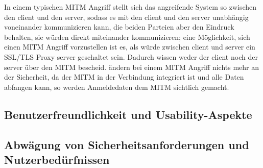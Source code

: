 In einem typischen \ac{MITM} Angriff stellt sich das angreifende System so zwischen den \gls{client} und den \gls{server}, sodass es mit den \gls{client} und den \gls{server} unabhängig voneinander kommunizieren kann, die beiden Parteien aber den Eindruck behalten, sie würden direkt miteinander kommunizieren; eine Möglichkeit, sich einen \ac{MITM} Angriff vorzustellen ist es, als würde zwischen \gls{client} und \gls{server} ein \ac{SSL}/\ac{TLS} Proxy \gls{server} geschaltet sein.\autocite[\vglf][]{greenwood2014smv} Dadurch wissen weder der \gls{client} noch der \gls{server} über den \ac{MITM} bescheid.
 ändern bei einem \ac{MITM} Angriff nichts mehr an der Sicherheit, da der \ac{MITM} in der Verbindung integriert ist und alle Daten abfangen kann, so werden \zb Anmeldedaten dem \ac{MITM} sichtlich gemacht.\autocite[\vglf][]{greenwood2014smv}

\subsection{Benutzerfreundlichkeit und Usability-Aspekte}\label{subsec:benutzerfreundlichkeit_und_usability-aspekte}

\subsection{Abwägung von Sicherheitsanforderungen und Nutzerbedürfnissen}\label{subsec:abwaegung_von_sicherheitsanforderungen_und_nutzerbeduerfnissen}